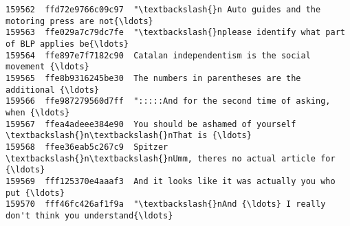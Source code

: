 \documentclass[11pt]{article}
\begin{document}
\begin{Verbatim}[commandchars=\\\{\}]
159562  ffd72e9766c09c97  "\textbackslash{}n Auto guides and the motoring press are not{\ldots}   
159563  ffe029a7c79dc7fe  "\textbackslash{}nplease identify what part of BLP applies be{\ldots}   
159564  ffe897e7f7182c90  Catalan independentism is the social movement {\ldots}   
159565  ffe8b9316245be30  The numbers in parentheses are the additional {\ldots}   
159566  ffe987279560d7ff  ":::::And for the second time of asking, when {\ldots}   
159567  ffea4adeee384e90  You should be ashamed of yourself \textbackslash{}n\textbackslash{}nThat is {\ldots}   
159568  ffee36eab5c267c9  Spitzer \textbackslash{}n\textbackslash{}nUmm, theres no actual article for {\ldots}   
159569  fff125370e4aaaf3  And it looks like it was actually you who put {\ldots}   
159570  fff46fc426af1f9a  "\textbackslash{}nAnd {\ldots} I really don't think you understand{\ldots}   


\end{Verbatim}
\end{document}
